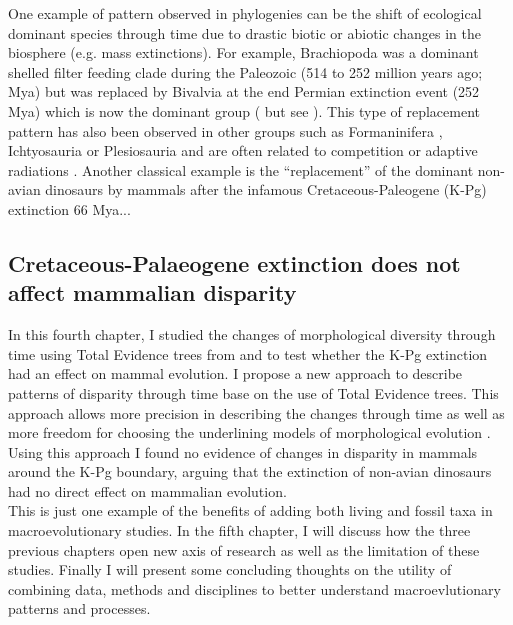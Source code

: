One example of pattern observed in phylogenies can be the shift of ecological dominant species through time due to drastic biotic or abiotic changes in the biosphere (e.g. mass extinctions).
For example, Brachiopoda was a dominant shelled filter feeding clade during the Paleozoic (514 to 252 million years ago; Mya) but was replaced by Bivalvia at the end Permian extinction event (252 Mya) which is now the dominant group (\citealt{Sepkiski1981,CLAPHAM01102006} but see \citealt{Payne22052014}).
This type of replacement pattern has also been observed in other groups such as Formaninifera \citep{Coxall01042006}, Ichtyosauria \citep{thorneresetting2011} or Plesiosauria \citealt{bensonfaunal2014} and are often related to competition \citep{brusatte50} or adaptive radiations \citep{Losos2010}.
Another classical example is the ``replacement'' of the dominant non-avian dinosaurs by mammals after the infamous Cretaceous-Paleogene (K-Pg) extinction 66 Mya...

\subsection{Cretaceous-Palaeogene extinction does not affect mammalian disparity}
In this fourth chapter, I studied the changes of morphological diversity \citep[or disparity;][]{Wills1994} through time using Total Evidence trees from \cite{slaterphylogenetic2013} and \cite{beckancient2014} to test whether the K-Pg extinction had an effect on mammal evolution.
I propose a new approach to describe patterns of disparity through time base on the use of Total Evidence trees.
This approach allows more precision in describing the changes through time as well as more freedom for choosing the underlining models of morphological evolution \citep[e.g. punctuated or gradual;][]{Hunt21042015}.
Using this approach I found no evidence of changes in disparity in mammals around the K-Pg boundary, arguing that the extinction of non-avian dinosaurs had no direct effect on mammalian evolution.\\

This is just one example of the benefits of adding both living and fossil taxa in macroevolutionary studies.
In the fifth chapter, I will discuss how the three previous chapters open new axis of research %
as well as the limitation of these studies.
Finally I will present some concluding thoughts on the utility of combining data, methods and disciplines to better understand macroevlutionary patterns and processes.

%